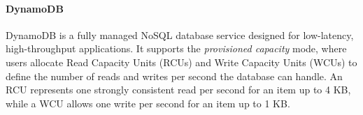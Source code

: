 
\paragraph{DynamoDB}
DynamoDB is a fully managed NoSQL database service designed for low-latency, high-throughput applications. It supports the \textit{provisioned capacity} mode, where users allocate Read Capacity Units (RCUs) and Write Capacity Units (WCUs) to define the number of reads and writes per second the database can handle. An RCU represents one strongly consistent read per second for an item up to 4 KB, while a WCU allows one write per second for an item up to 1 KB. 

